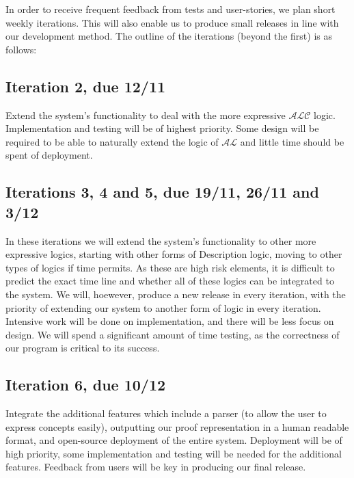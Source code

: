 In order to receive frequent feedback from tests and user-stories, we plan short weekly iterations. This will also enable us to produce small releases in line with our development method. The outline of the iterations (beyond the first) is as follows:

\subsection*{Iteration 2, due 12/11} Extend the system's functionality to deal with the more expressive $\mathcal{ALC}$ logic. Implementation and testing will be of highest priority. Some design will be required to be able to naturally extend the logic of $\mathcal{AL}$ and little time should be spent of deployment.

\subsection*{Iterations 3, 4 and 5, due 19/11, 26/11 and 3/12} In these iterations we will extend the system's functionality to other more expressive logics, starting with other forms of Description logic, moving to other types of logics if time permits. As these are high risk elements, it is difficult to predict the exact time line and whether all of these logics can be integrated to the system. We will, hoewever, produce a new release in every iteration, with the priority of extending our system to another form of logic in every iteration. 
Intensive work will be done on implementation, and there will be less focus on design. We will spend a significant amount of time testing, as the correctness of our program is critical to its success.

\subsection*{Iteration 6, due 10/12} Integrate the additional features which include a parser (to allow the user to express concepts easily), outputting our proof representation in a human readable format, and open-source deployment of the entire system. Deployment will be of high priority, some implementation and testing will be needed for the additional features.
Feedback from users will be key in producing our final release.
